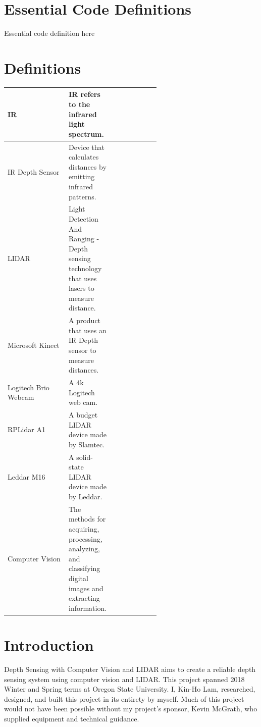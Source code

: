 \documentclass[onecolumn, draftclsnofoot,10pt, compsoc]{IEEEtran}
\begin{document}
\begin{singlespace}
\appendix
\section{Essential Code Definitions}
Essential code definition here
\appendix
	\section{Definitions}
		\begin{longtable}{|l|p{0.3\linewidth}|p{0.3\linewidth}|} \\\hline 
			IR & IR refers to the infrared light spectrum. \label{def:IR} \\\hline
			IR Depth Sensor & Device that calculates distances by emitting infrared patterns. \label{def:depthsensor} \\\hline
			LIDAR & Light Detection And Ranging - Depth sensing technology that uses lasers to measure distance. \label{def:lidar} \\\hline
			Microsoft Kinect & A product that uses an IR Depth sensor to measure distances. \label{def:kinect} \\\hline
			Logitech Brio Webcam & A 4k Logitech web cam. \cite{logitech} \label{def:brio} \\\hline
			RPLidar A1 & A budget LIDAR device made by Slamtec. \cite{slamtec} \label{def:rplidar} \\\hline
			Leddar M16 & A solid-state LIDAR device made by Leddar. \cite{leddartech} & \label{def:m16} \\\hline
			Computer Vision & The methods for acquiring, processing, analyzing, and classifying digital images and extracting information. \label{def:vision}\\\hline
		\end{longtable}

	\section{Introduction}
		Depth Sensing with Computer Vision and LIDAR aims to create a reliable depth sensing system using computer vision and LIDAR. 
		This project spanned 2018 Winter and Spring terms at Oregon State University.
		I, Kin-Ho Lam, researched, designed, and built this project in its entirety by myself. 
		Much of this project would not have been possible without my project's sponsor, Kevin McGrath, who supplied equipment and technical guidance.
		


\end{singlespace}
\end{document}
